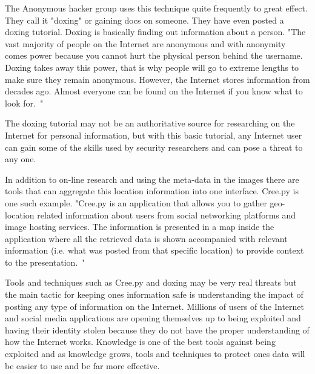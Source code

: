The Anonymous hacker group uses this technique quite frequently to great
effect. They call it "doxing" or gaining docs on someone. They have even posted
a doxing tutorial. Doxing is basically finding out information about a person. 
"The vast majority of people on the Internet are anonymous and with anonymity
comes power because you cannot hurt the physical person behind the username.
Doxing takes away this power, that is why people will go to extreme lengths to
make sure they remain anonymous.  However, the Internet stores information from
decades ago. Almost everyone can be found on the Internet if you know what to
look for.~\cite{doxing}"

The doxing tutorial may not be an authoritative source for researching on the Internet
for personal information, but with this basic tutorial, any Internet user can gain
some of the skills used by security researchers and can pose a threat to any
one.

In addition to on-line research and using the meta-data in the images there are
tools that can aggregate this location information into one interface. Cree.py is
one such example. "Cree.py is an application that allows you to gather
geo-location related information about users from social networking platforms
and image hosting services. The information is presented in a map inside the
application where all the retrieved data is shown accompanied with relevant
information (i.e. what was posted from that specific location) to provide
context to the presentation.~\cite{creepy}"

Tools and techniques such as Cree.py and doxing may be very real threats but the
main tactic for keeping ones information safe is understanding the impact of
posting any type of information on the Internet. Millions of users of the
Internet and social media applications are opening themselves up to being
exploited and having their identity stolen because they do not have the proper
understanding of how the Internet works. Knowledge is one of the best tools
against being exploited and as knowledge grows, tools and techniques to protect
ones data will be easier to use and be far more effective.%
